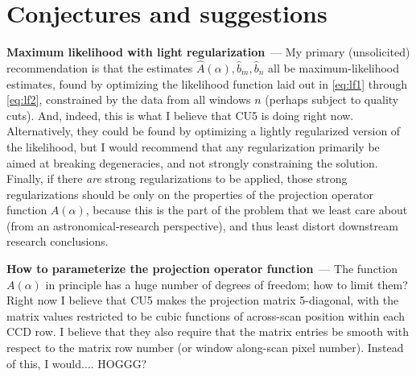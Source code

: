 \documentclass[11pt]{article}
\renewcommand{\paragraph}[1]{\medskip\par\noindent\textbf{#1}~---}
\begin{document}
\section{Conjectures and suggestions}

\paragraph{Maximum likelihood with light regularization}
My primary (unsolicited) recommendation is that the estimates $\hat{A}(\alpha), \hat{b}_m, \hat{b}_n$ all be maximum-likelihood estimates, found by optimizing the likelihood function laid out in \eqref{eq:lf1} through \eqref{eq:lf2}, constrained by the data from all windows $n$ (perhaps subject to quality cuts).
And, indeed, this is what I believe that CU5 is doing right now.
Alternatively, they could be found by optimizing a lightly regularized version of the likelihood, but I would recommend that any regularization primarily be aimed at breaking degeneracies, and not strongly constraining the solution.
Finally, if there \emph{are} strong regularizations to be applied, those strong regularizations should be only on the properties of the projection operator function $A(\alpha)$, because this is the part of the problem that we least care about (from an astronomical-research perspective), and thus least distort downstream research conclusions.

\paragraph{How to parameterize the projection operator function}
The function $A(\alpha)$ in principle has a huge number of degrees of freedom; how to limit them?
Right now I believe that CU5 makes the projection matrix 5-diagonal, with the matrix values restricted to be cubic functions of across-scan position within each CCD row.
I believe that they also require that the matrix entries be smooth with respect to the matrix row number (or window along-scan pixel number).
Instead of this, I would.... HOGGG?
\end{document}
